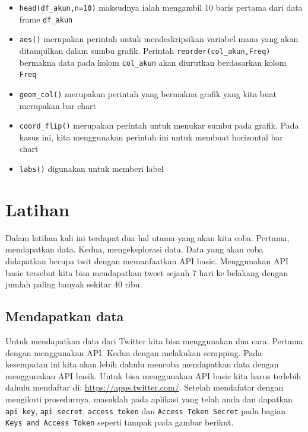 \documentclass[]{book}
\providecommand{\tightlist}{%
  \setlength{\itemsep}{0pt}\setlength{\parskip}{0pt}}
\begin{document}
\begin{itemize}
\tightlist
\item
  \texttt{head(df\_akun,n=10)} maksudnya ialah mengambil 10 baris
  pertama dari data frame \texttt{df\_akun}
\item
  \texttt{aes()} merupakan perintah untuk mendeskripsikan variabel mana
  yang akan ditampilkan dalam sumbu grafik. Perintah
  \texttt{reorder(col\_akun,Freq)} bermakna data pada kolom
  \texttt{col\_akun} akan diurutkan berdasarkan kolom \texttt{Freq}
\item
  \texttt{geom\_col()} merupakan perintah yang bermakna grafik yang kita
  buat merupakan bar chart
\item
  \texttt{coord\_flip()} merupakan perintah untuk menukar sumbu pada
  grafik. Pada kasus ini, kita menggunakan perintah ini untuk membuat
  horizontal bar chart
\item
  \texttt{labs()} digunakan untuk memberi label
\end{itemize}

\hypertarget{latihan}{%
\chapter{Latihan}\label{latihan}}

Dalam latihan kali ini terdapat dua hal utama yang akan kita coba.
Pertama, mendapatkan data. Kedua, mengeksplorasi data. Data yang akan
coba didapatkan berupa twit dengan memanfaatkan API basic. Menggunakan
API basic tersebut kita bisa mendapatkan tweet sejauh 7 hari ke belakang
dengan jumlah paling banyak sekitar 40 ribu.

\hypertarget{mendapatkan-data}{%
\section{Mendapatkan data}\label{mendapatkan-data}}

Untuk mendapatkan data dari Twitter kita bisa menggunakan dua cara.
Pertama dengan menggunakan API. Kedua dengan melakukan scrapping. Pada
kesempatan ini kita akan lebih dahulu mencoba mendapatkan data dengan
menggunakan API basik. Untuk bisa menggunakan API basic kita harus
terlebih dahulu mendaftar di: \url{https://apps.twitter.com/}. Setelah
mendafatar dengan mengikuti prosedurnya, masuklah pada aplikasi yang
telah anda dan dapatkan \texttt{api\ key}, \texttt{api\ secret},
\texttt{access\ token} dan \texttt{Access\ Token\ Secret} pada bagian
\texttt{Keys\ and\ Access\ Token} seperti tampak pada gambar berikut.
\end{document}
